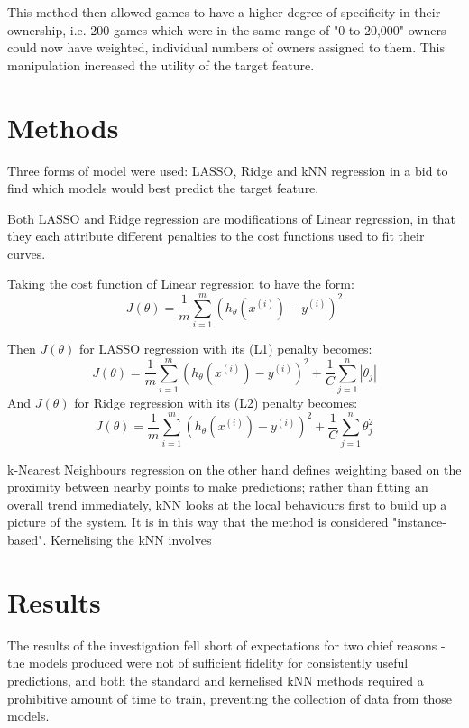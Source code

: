 This method then allowed games to have a higher degree of specificity in their ownership, i.e. 200 games which were in the same range of "0 to 20,000" owners could now have weighted, individual numbers of owners assigned to them. This manipulation increased the utility of the target feature.

\section{Methods}
Three forms of model were used: LASSO, Ridge and kNN regression in a bid to find which models would best predict the target feature.

Both LASSO and Ridge regression are modifications of Linear regression, in that they each attribute different penalties to the cost functions used to fit their curves.

Taking the cost function of Linear regression to have the form:
\[
J(\theta) = \frac{1}{m} \sum_{i=1}^m (h_{\theta}(x^{(i)}) - y^{(i)})^2
\]

Then $J(\theta)$ for LASSO regression with its (L1) penalty becomes:
\[
J(\theta) = \frac{1}{m} \sum_{i=1}^m (h_{\theta}(x^{(i)}) - y^{(i)})^2 + \frac{1}{C} \sum_{j=1}^n |\theta_j|
\]
And $J(\theta)$ for Ridge regression with its (L2) penalty becomes:
\[
J(\theta) = \frac{1}{m} \sum_{i=1}^m (h_{\theta}(x^{(i)}) - y^{(i)})^2 + \frac{1}{C} \sum_{j=1}^n \theta_j^2
\]

k-Nearest Neighbours regression on the other hand defines weighting based on the proximity between nearby points to make predictions; rather than fitting an overall trend immediately, kNN looks at the local behaviours first to build up a picture of the system. It is in this way that the method is considered "instance-based".
 Kernelising the kNN involves

\section{Results}

The results of the investigation fell short of expectations for two chief reasons - the models produced were not of sufficient fidelity for consistently useful predictions, and both the standard and kernelised kNN methods required a prohibitive amount of time to train, preventing the collection of data from those models. %

